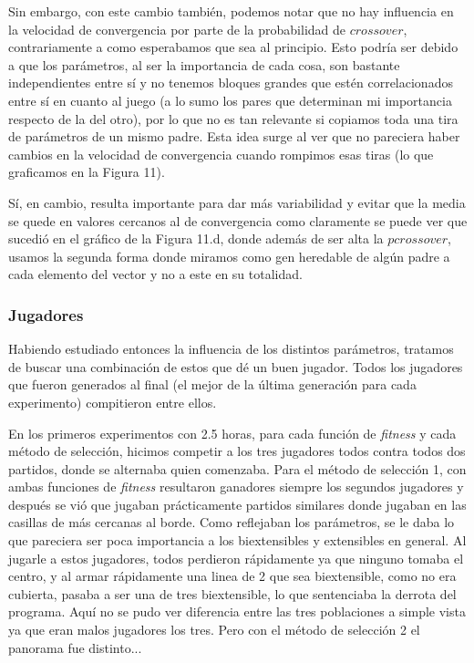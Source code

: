 \documentclass[A4paper,oneside,fleqn,11pt]{article}
\theoremstyle{definition}
\begin{document}
Sin embargo, con este cambio también, podemos notar que no hay influencia en la velocidad de convergencia por parte de la probabilidad de $crossover$, contrariamente a como esperabamos que sea al principio. Esto podría ser debido a que los parámetros, al ser la importancia de cada cosa, son bastante independientes entre sí y no tenemos bloques grandes que estén correlacionados entre sí en cuanto al juego (a lo sumo los pares que determinan mi importancia respecto de la del otro), por lo que no es tan relevante si copiamos toda una tira de parámetros de un mismo padre. Esta idea surge al ver que no pareciera haber cambios en la velocidad de convergencia cuando rompimos esas tiras (lo que graficamos en la Figura 11).

Sí, en cambio, resulta importante para dar más variabilidad y evitar que la media se quede en valores cercanos al de convergencia como claramente se puede ver que sucedió en el gráfico de la Figura 11.d, donde además de ser alta la $pcrossover$, usamos la segunda forma donde miramos como gen heredable de algún padre a cada elemento del vector y no a este en su totalidad.

\subsubsection{Jugadores}
Habiendo estudiado entonces la influencia de los distintos parámetros, tratamos de buscar una combinación de estos que dé un buen jugador. Todos los jugadores que fueron generados al final (el mejor de la última generación para cada experimento) compitieron entre ellos.

En los primeros experimentos con 2.5 horas, para cada función de \textit{fitness} y cada método de selección, hicimos competir a los tres jugadores todos contra todos dos partidos, donde se alternaba quien comenzaba. Para el método de selección 1, con ambas funciones de \textit{fitness} resultaron ganadores siempre los segundos jugadores y después se vió que jugaban prácticamente partidos similares donde jugaban en las casillas de más cercanas al borde. Como reflejaban los parámetros, se le daba lo que pareciera ser poca importancia a los biextensibles y extensibles en general. Al jugarle a estos jugadores, todos perdieron rápidamente ya que ninguno tomaba el centro, y al armar rápidamente una linea de 2 que sea biextensible, como no era cubierta, pasaba a ser una de tres biextensible, lo que sentenciaba la derrota del programa. Aquí no se pudo ver diferencia entre las tres poblaciones a simple vista ya que eran malos jugadores los tres. Pero con el método de selección 2 el panorama fue distinto...
\end{document}
